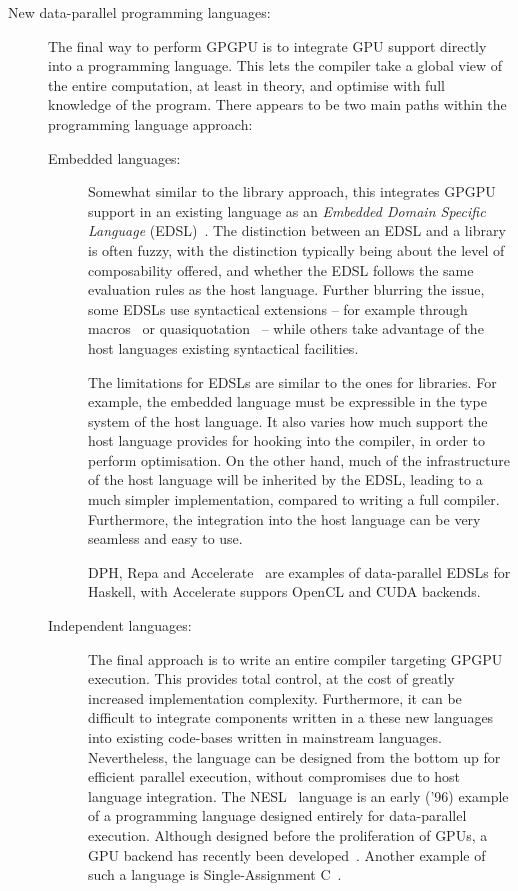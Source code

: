\begin{description}
\item[New data-parallel programming languages:] The final way to
  perform GPGPU is to integrate GPU support directly into a
  programming language.  This lets the compiler take a global view of
  the entire computation, at least in theory, and optimise with full
  knowledge of the program.  There appears to be two main paths within
  the programming language approach:

\begin{description}
\item[Embedded languages:] Somewhat similar to the library approach,
  this integrates GPGPU support in an existing language as an
  \textit{Embedded Domain Specific Language}
  (EDSL)~\cite{czarnecki2004dsl}.  The distinction between an EDSL and
  a library is often fuzzy, with the distinction typically being about
  the level of composability offered, and whether the EDSL follows the
  same evaluation rules as the host language.  Further blurring the
  issue, some EDSLs use syntactical extensions -- for example through
  macros~\cite{kohlbecker1986hygienic} or
  quasiquotation~\cite{mainland2007s} -- while others take advantage
  of the host languages existing syntactical facilities.

  The limitations for EDSLs are similar to the ones for libraries.
  For example, the embedded language must be expressible in the type
  system of the host language.  It also varies how much support the
  host language provides for hooking into the compiler, in order to
  perform optimisation.  On the other hand, much of the infrastructure
  of the host language will be inherited by the EDSL, leading to a
  much simpler implementation, compared to writing a full compiler.
  Furthermore, the integration into the host language can be very
  seamless and easy to use.

  DPH, Repa and
  Accelerate~\cite{Chak06DPH,keller2010regular,ArrayAccelerate} are
  examples of data-parallel EDSLs for Haskell, with Accelerate suppors
  OpenCL and CUDA backends.

\item[Independent languages:] The final approach is to write an entire
  compiler targeting GPGPU execution.  This provides total control, at
  the cost of greatly increased implementation complexity.
  Furthermore, it can be difficult to integrate components written in
  a these new languages into existing code-bases written in mainstream
  languages.  Nevertheless, the language can be designed from the
  bottom up for efficient parallel execution, without compromises due
  to host language integration.  The NESL~\cite{BlellochCACM96NESL}
  language is an early ('96) example of a programming language
  designed entirely for data-parallel execution.  Although designed
  before the proliferation of GPUs, a GPU backend has recently been
  developed~\cite{bergstrom2012nested}.  Another example of such a
  language is Single-Assignment C~\cite{grelck2006sac}.


\end{description}
\end{description}
